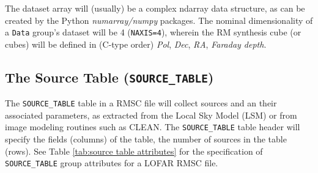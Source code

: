 \documentclass[a4paper,10pt,bibtotoc]{scrartcl}
\begin{document}

The dataset array will (usually) be a complex ndarray data structure, as can be created by the Python \textit{numarray/numpy} packages. The nominal dimensionality of a \texttt{Data} group's dataset will be 4 (\texttt{NAXIS=4}), wherein the RM synthesis cube (or cubes) will be defined in (C-type order) \textit{Pol}, \textit{Dec}, \textit{RA}, \textit{Faraday depth}.


\subsection{The Source Table ({\tt SOURCE\_TABLE})}
\label{sec:source table}

The \verb|SOURCE_TABLE| table in a RMSC file will collect sources and an their associated parameters, as extracted from the Local Sky Model (LSM) or from image modeling routines such as CLEAN. The \verb|SOURCE_TABLE| table header will specify the fields (columns) of the table, the number of sources in the table (rows). See Table \ref{tab:source table attributes} for the specification of \verb|SOURCE_TABLE| group attributes for a LOFAR RMSC file.

\end{document}
